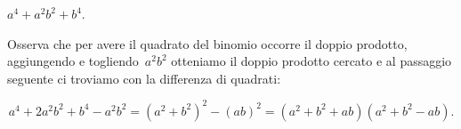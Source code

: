 % 
% 
% 
% 
% 
% 
% 
% 
% 

 \begin{esempio}
 $a^4+a^{2}b^{2}+b^4$.

Osserva che per avere il quadrato del binomio occorre il doppio
prodotto, aggiungendo e togliendo~$a^{2}b^{2}$ otteniamo il doppio
prodotto cercato e al passaggio seguente ci troviamo con la differenza
di quadrati:

\[a^4+2a^2b^2+b^4 -a^2b^2=\left(a^2+b^2\right)^2-\left(ab\right)^2%
 =\left(a^2+b^2+ab\right)\left(a^2+b^2-ab\right).\]

 \end{esempio}
% 
% 

